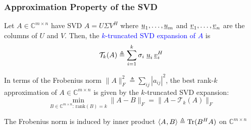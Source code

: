 \documentclass[10pt,english,aspectratio=169]{beamer}
\begin{document}
\begin{frame} \frametitle{Approximation Property of the SVD}

\begin{definition}
Let $A \in \mathbb{C}^{m\times n}$ have SVD $A=U \Sigma V^H$ where $\underline{u}_1,\ldots,\underline{u}_m$ and $\underline{v}_1,\ldots,\underline{v}_n$ are the columns of $U$ and $V$.
Then, the \textcolor{blue}{$k$-truncated SVD expansion of $A$} is \vspace{-2mm}
\[ \mathcal{T}_k (A) \triangleq \sum_{i=1}^k \sigma_i \; \underline{u}_i \, \underline{v}_i^H \]
\end{definition}

\vspace{2mm}

\begin{theorem}
In terms of the Frobenius norm $\| A \|_F^2 \triangleq \sum_{ij} |a_{ij}|^2$, the best rank-$k$ approximation of $A \in \mathbb{C}^{m\times n}$ is given by the $k$-truncated SVD expansion: \vspace{-2mm}
\[ \min_{B \in \mathbb{C}^{m\times n}: \, \text{rank}(B)=k} \| A - B \|_F  = \| A - \mathcal{T}_k (A) \|_F \]
\end{theorem}

\vspace{2mm}

The Frobenius norm is induced by inner product ${\langle  A  \mskip1mu ,  B  \rangle} \triangleq \text{Tr} (B^H A)$ on $\mathbb{C}^{m \times n}$  
\end{frame}
\end{document}
